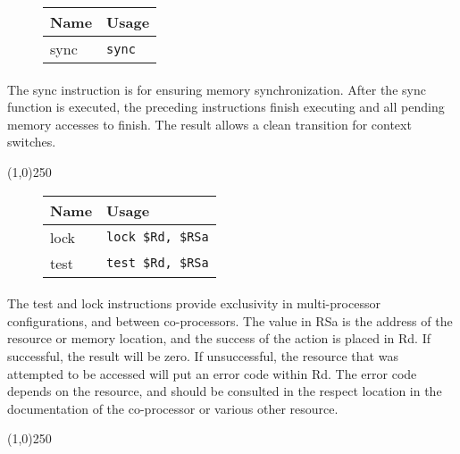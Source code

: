 \documentclass[letterpaper, 11pt]{article}
\begin{document}
\begin{figure}[!h]
	\begin{center}
		\begin{tabular}{|l|l|}
			\hline
			Name		& Usage \\ \hline
			sync		& \texttt{sync}	\\ \hline
		 		\end{tabular} 
	\end{center}
	
\end{figure}
\paragraph{} The sync instruction is for ensuring memory synchronization. After the sync function is executed, the preceding instructions
finish executing and all pending memory accesses to finish. The result allows a clean transition for context switches.

\begin{center}
	\line(1,0){250}
\end{center}

\begin{figure}[!h]
	\begin{center}
		\begin{tabular}{|l|l|}
			\hline
			Name		& Usage \\ \hline
			lock		& \texttt{lock \$Rd, \$RSa}	\\ \hline
			test		& \texttt{test \$Rd, \$RSa}	\\ \hline
		 		\end{tabular} 
	\end{center}
	
\end{figure}
\paragraph{} The test and lock instructions provide exclusivity in multi-processor configurations, and between co-processors. The
value in RSa is the address of the resource or memory location, and the success of the action is placed in Rd. If successful,
the result will be zero. If unsuccessful, the resource that was attempted to be accessed will put an error code within Rd.
The error code depends on the resource, and should be consulted in the respect location in the documentation of the co-processor or
various other resource.

\begin{center}
	\line(1,0){250}
\end{center}
\end{document}
